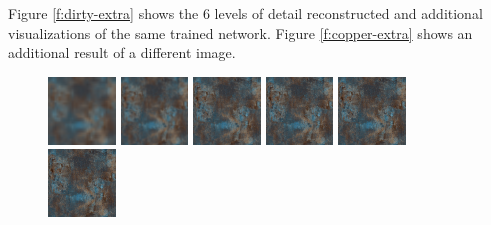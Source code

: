 Figure \ref{f:dirty-extra} shows the 6 levels of detail reconstructed and additional visualizations of the same trained network. Figure \ref{f:copper-extra} shows an additional result of a different image.


\begin{figure}[!h]
\centering
\includegraphics[width=0.16\textwidth]{img/ch6/dirty/train1.png}
\includegraphics[width=0.16\textwidth]{img/ch6/dirty/train2.png}
\includegraphics[width=0.16\textwidth]{img/ch6/dirty/train3.png}
\includegraphics[width=0.16\textwidth]{img/ch6/dirty/train4.png}
\includegraphics[width=0.16\textwidth]{img/ch6/dirty/train5.png}
\includegraphics[width=0.16\textwidth]{img/ch6/dirty/train6.png}


\end{figure}
